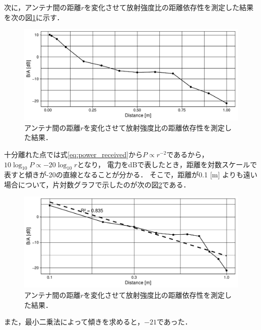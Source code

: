 \documentclass[uplatex,dvipdfmx,a4j,12pt]{jsarticle}
\begin{document}
次に，アンテナ間の距離$r$を変化させて放射強度比の距離依存性を測定した結果を次の図\ref{fig:5-2}に示す．
\begin{figure}
  \centering
  \includegraphics[width=\linewidth]{data/5_2/gain.pdf}
  \caption{アンテナ間の距離$r$を変化させて放射強度比の距離依存性を測定した結果．}
  \label{fig:5-2}
\end{figure}
十分離れた点では式\eqref{eq:power_received}から$P \propto r ^ {-2}$であるから，$10\log_{10} P \propto -20 \log_{10} r$となり，
電力をdBで表したとき，距離を対数スケールで表すと傾きが-20の直線となることが分かる．
そこで，距離が0.1 [m] よりも遠い場合について，片対数グラフで示したのが次の図\ref{fig:5-3}である．
\begin{figure}[H]
    \centering
    \includegraphics[width=\linewidth]{data/5_2/gain2.pdf}
    \caption{アンテナ間の距離$r$を変化させて放射強度比の距離依存性を測定した結果．}
    \label{fig:5-3}
\end{figure}
また，最小二乗法によって傾きを求めると，$-21$であった．
\end{document}

